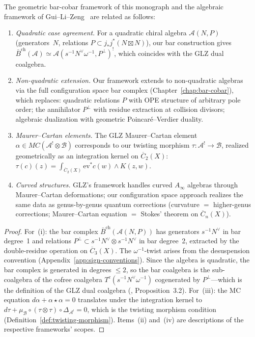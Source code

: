 \begin{proposition}
\label{prop:comparison-our-glz}
The geometric bar-cobar framework of this monograph and the algebraic
framework of Gui--Li--Zeng~\cite{GLZ22} are related as follows:
\begin{enumerate}
\item \emph{Quadratic case agreement.}
   For a quadratic chiral algebra $\mathcal{A}(N,P)$ (generators~$N$,
   relations $P \subset j_*j^*(N \boxtimes N)$), our bar construction
   gives $\bar{B}^{\mathrm{ch}}(\mathcal{A}) \simeq
   \mathcal{A}(s^{-1}N^{\vee}\omega^{-1}, P^{\perp})^!$,
   which coincides with the GLZ dual coalgebra.
\item \emph{Non-quadratic extension.}
   Our framework extends to non-quadratic algebras via the full
   configuration space bar complex (Chapter~\ref{chap:bar-cobar}),
   which replaces: quadratic relations $P$ with OPE structure of
   arbitrary pole order; the annihilator $P^{\perp}$ with residue
   extraction at collision divisors; algebraic dualization with
   geometric Poincar\'e--Verdier duality.
\item \emph{Maurer--Cartan elements.}
   The GLZ Maurer--Cartan element
   $\alpha \in MC(\mathcal{A}^! \otimes \mathcal{B})$
   corresponds to our twisting morphism
   $\tau\colon \mathcal{A}^! \to \mathcal{B}$,
   realized geometrically as an integration kernel on
   $\overline{C}_2(X)$:
   $\tau(c)(z) = \int_{\overline{C}_2(X)}
   \mathrm{ev}^* c(w) \wedge K(z, w)$.
\item \emph{Curved structures.}
   GLZ's framework handles curved $A_{\infty}$ algebras through
   Maurer--Cartan deformations; our configuration space approach
   realizes the same data as genus-by-genus quantum corrections
   (curvature $=$ higher-genus corrections; Maurer--Cartan equation
   $=$ Stokes' theorem on $\overline{C}_n(X)$).
\end{enumerate}
\end{proposition}

\begin{proof}
For~(i): the bar complex $\bar{B}^{\mathrm{ch}}(\mathcal{A}(N,P))$
has generators $s^{-1}N^\vee$ in bar degree~1 and relations
$P^\perp \subset s^{-1}N^\vee \otimes s^{-1}N^\vee$ in bar degree~2,
extracted by the double-residue operation on $\overline{C}_3(X)$.  The
$\omega^{-1}$-twist arises from the desuspension convention
(Appendix~\ref{app:sign-conventions}).  Since the algebra is quadratic,
the bar complex is generated in degrees $\leq 2$, so the bar
coalgebra is the sub-coalgebra of the cofree coalgebra
$T^c(s^{-1}N^\vee \omega^{-1})$ cogenerated by $P^\perp$---which is
the definition of the GLZ dual coalgebra
(\cite{GLZ22}, Proposition~3.2).  For~(iii): the MC equation
$d\alpha + \alpha \star \alpha = 0$ translates under the integration
kernel to $d\tau + \mu_{\mathcal{B}} \circ (\tau \otimes \tau)
\circ \Delta_{\mathcal{A}^!} = 0$, which is the twisting morphism
condition (Definition~\ref{def:twisting-morphism}).  Items~(ii)
and~(iv) are descriptions of the respective frameworks' scopes.
\end{proof}

